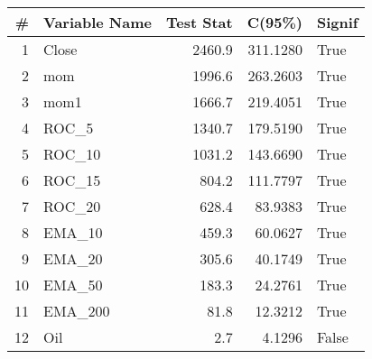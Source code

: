 \begin{tabular}{rlrrl}
\toprule
\# &  Variable Name &   Test Stat & C(95\%) & Signif \\
\midrule
1 & Close  &  2460.9    & 311.1280 &    True \\
2 & mom    &  1996.6     & 263.2603   & True\\
3 & mom1   &  1666.7     & 219.4051   & True\\
4 & ROC\_5  &  1340.7    & 179.5190 &    True\\
5 & ROC\_10 &  1031.2    & 143.6690 &    True\\
6 & ROC\_15 &  804.2     & 111.7797   & True\\
7 & ROC\_20 &  628.4     & 83.9383    & True\\
8 & EMA\_10 &  459.3     & 60.0627    & True\\
9 & EMA\_20 &  305.6     & 40.1749    & True\\
10 & EMA\_50 &  183.3     & 24.2761    & True\\
11 & EMA\_200 &  81.8     & 12.3212    & True\\
12 & Oil    &  2.7      & 4.1296     & False\\ 
\bottomrule
\end{tabular}
